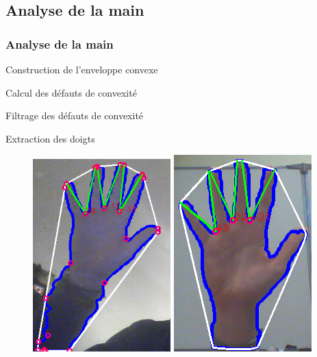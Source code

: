 \documentclass{beamer}
\begin{document}
\subsection{Analyse de la main}
\begin{frame}
  \frametitle{Analyse de la main}
  \begin{block}{}
    Construction de l'enveloppe convexe
  \end{block}
  \begin{block}{}
    Calcul des défauts de convexité
  \end{block}
  \begin{block}{}
    Filtrage des défauts de convexité
  \end{block}
  \begin{block}{}
    Extraction des doigts
  \end{block}
\end{frame}
\begin{frame}
\begin{figure}
   \includegraphics[width=0.475\textwidth]{./unfiltered.png}
   \hfill
   \includegraphics[width=0.475\textwidth]{./filtered.png}
\end{figure}
\end{frame}
\end{document}
